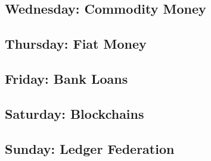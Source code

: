 \documentclass[11pt,twoside,a4paper]{article}
\begin{document}
\subsection{Wednesday: Commodity Money}
\subsection{Thursday: Fiat Money}
\subsection{Friday: Bank Loans}
\subsection{Saturday: Blockchains}
\subsection{Sunday: Ledger Federation}
\end{document}

